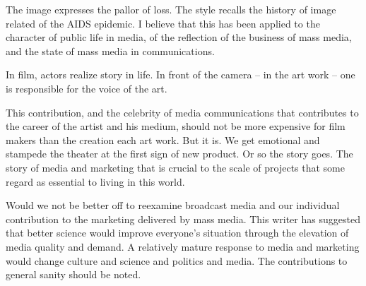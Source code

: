 

The image expresses the pallor of loss.  The style recalls the history
of image related of the AIDS epidemic.  I believe that this has been
applied to the character of public life in media, of the reflection of
the business of mass media, and the state of mass media in
communications.

In film, actors realize story in life.  In front of the camera -- in
the art work -- one is responsible for the voice of the art.

This contribution, and the celebrity of media communications that
contributes to the career of the artist and his medium, should not be
more expensive for film makers than the creation each art work.  But
it is.  We get emotional and stampede the theater at the first sign of
new product.  Or so the story goes.  The story of media and marketing
that is crucial to the scale of projects that some regard as essential
to living in this world.

Would we not be better off to reexamine broadcast media and our
individual contribution to the marketing delivered by mass media.
This writer has suggested that better science would improve everyone's
situation through the elevation of media quality and demand.  A
relatively mature response to media and marketing would change culture
and science and politics and media.  The contributions to general
sanity should be noted.

\bye
